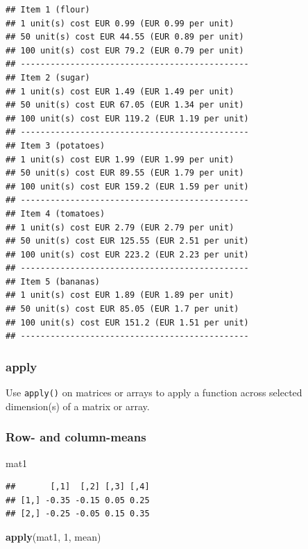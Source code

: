 \documentclass[
  11pt,
]{article}
\newenvironment{Shaded}{\begin{snugshade}}{\end{snugshade}}
\newcommand{\DecValTok}[1]{\textcolor[rgb]{0.00,0.00,0.81}{#1}}
\newcommand{\FunctionTok}[1]{\textcolor[rgb]{0.13,0.29,0.53}{\textbf{#1}}}
\newcommand{\NormalTok}[1]{#1}
\begin{document}
\begin{verbatim}
## Item 1 (flour)
## 1 unit(s) cost EUR 0.99 (EUR 0.99 per unit)
## 50 unit(s) cost EUR 44.55 (EUR 0.89 per unit)
## 100 unit(s) cost EUR 79.2 (EUR 0.79 per unit)
## ----------------------------------------------
## Item 2 (sugar)
## 1 unit(s) cost EUR 1.49 (EUR 1.49 per unit)
## 50 unit(s) cost EUR 67.05 (EUR 1.34 per unit)
## 100 unit(s) cost EUR 119.2 (EUR 1.19 per unit)
## ----------------------------------------------
## Item 3 (potatoes)
## 1 unit(s) cost EUR 1.99 (EUR 1.99 per unit)
## 50 unit(s) cost EUR 89.55 (EUR 1.79 per unit)
## 100 unit(s) cost EUR 159.2 (EUR 1.59 per unit)
## ----------------------------------------------
## Item 4 (tomatoes)
## 1 unit(s) cost EUR 2.79 (EUR 2.79 per unit)
## 50 unit(s) cost EUR 125.55 (EUR 2.51 per unit)
## 100 unit(s) cost EUR 223.2 (EUR 2.23 per unit)
## ----------------------------------------------
## Item 5 (bananas)
## 1 unit(s) cost EUR 1.89 (EUR 1.89 per unit)
## 50 unit(s) cost EUR 85.05 (EUR 1.7 per unit)
## 100 unit(s) cost EUR 151.2 (EUR 1.51 per unit)
## ----------------------------------------------
\end{verbatim}

\hypertarget{apply}{%
\subsubsection{apply}\label{apply}}

Use \texttt{apply()} on matrices or arrays to apply a function across selected dimension(s) of a matrix or array.

\hypertarget{row--and-column-means}{%
\subsubsection{Row- and column-means}\label{row--and-column-means}}

\begin{Shaded}
\begin{Highlighting}[]
\NormalTok{mat1}
\end{Highlighting}
\end{Shaded}

\begin{verbatim}
##       [,1]  [,2] [,3] [,4]
## [1,] -0.35 -0.15 0.05 0.25
## [2,] -0.25 -0.05 0.15 0.35
\end{verbatim}

\begin{Shaded}
\begin{Highlighting}[]
\FunctionTok{apply}\NormalTok{(mat1, }\DecValTok{1}\NormalTok{, mean)}
\end{Highlighting}
\end{Shaded}
\end{document}

